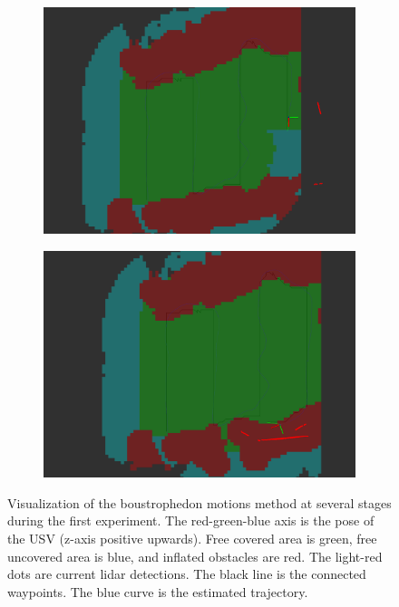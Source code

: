 \begin{figure}[h!]
{\begin{subfigure}[b]{0.5\textwidth}
		\includegraphics[height=0.25\textheight,width=1\textwidth]{fig/results/ex1_alg3}
		\caption{}
	\end{subfigure}
	\begin{subfigure}[b]{0.5\textwidth}
		\centering
		\includegraphics[height=0.25\textheight,width=1\textwidth]{fig/results/ex1_alg4}
		\caption{}
	\end{subfigure}
	}
\caption[Visualization of the boustrophedon motions method at several stages during the first experiment]{Visualization of the boustrophedon motions method at several stages during the first experiment. The red-green-blue axis is the pose of the USV (z-axis positive upwards). Free covered area is green, free uncovered area is blue, and inflated obstacles are red. The light-red dots are current lidar detections. The black line is the connected waypoints. The blue curve is the estimated trajectory.}
	\label{fig:res2}
\end{figure}

